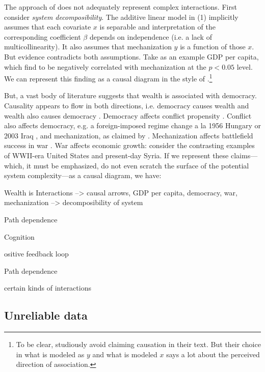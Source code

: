 \documentclass{article}
\begin{document}
The approach of \citet{sechser2010army} does not adequately represent complex interactions. First consider 
\textit{system decomposibility}. The additive linear model in (1) implicitly assumes 
that each covariate $x$ is separable and interpretation of the corresponding
coefficient $\beta$ depends on independence (i.e. a lack of multicollinearity).
It also assumes that mechanization $y$ is a function of those 
$x$. But evidence contradicts both assumptions. Take as an example GDP per
capita, which \citet{sechser2010army} find to be negatively correlated with
mechanization at the $p < 0.05$ level. We can represent this finding as a causal
diagram in the style of \citet{pearl2009causality}.\footnote{To be clear,
\citet{sechser2010army} studiously avoid claiming causation in their text. But
their choice in what is modeled as $y$ and what is modeled $x$ says a lot about the perceived
direction of association.}

But, a vast body of literature suggests that wealth is associated with
democracy. Causality appears to flow in both directions, i.e. democracy causes wealth and wealth also
causes democracy \citep{helliwell1994empirical,barro1996democracy,robinson2006economic,doucouliagos2008democracy}. 
Democracy affects conflict propensity \citep{maoz1993normative,russett1994grasping}. 
Conflict also affects democracy, e.g. a foreign-imposed regime change a la 1956
Hungary or 2003 Iraq
\citep{werner1996absolute,lo2008ensuring,downes2013forced}, and mechanization, 
as claimed by \citet{sechser2010army}. Mechanization affects battlefield success in war
\citep{biddle2004military,lyall2009rage}. War affects economic growth: 
consider the contrasting examples of WWII-era United States and present-day
Syria. If we represent these claims---which, it must be emphasized, do not even
scratch the surface of the potential system complexity---as a causal diagram, we
have:



Wealth is 
Interactions --> causal arrows, GDP per capita, democracy, war, mechanization
--> decomposibility of system

Path dependence

Cognition

ositive feedback loop

Path dependence

certain kinds of interactions

\subsection{Unreliable data}
\end{document}
